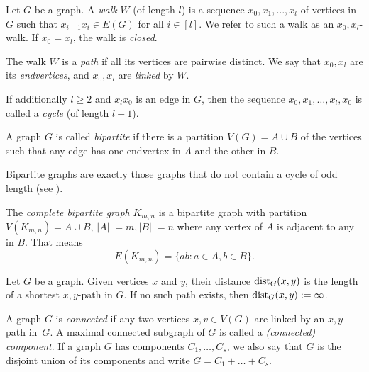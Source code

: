 \begin{definition}
    Let $G$ be a graph.
    A \textit{walk} $W$ (of length $l$) is a sequence $x_0, x_1, \dots, x_l$ of vertices in $G$ such that $x_{i - 1} x_i \in E(G)$ for all $i \in [l]$.
    We refer to such a walk as an $x_0,x_l$-walk.
    If $x_0 = x_l$, the walk is \textit{closed}.

    The walk $W$ is a \textit{path} if all its vertices are pairwise distinct. We say that $x_0, x_l$ are its \textit{endvertices}, and $x_0, x_l$ are \textit{linked} by $W$.
    
    If additionally $l \ge 2$ and $x_l x_0$ is an edge in $G$, then the sequence $x_0, x_1, \dots, x_l, x_0$ is called a \textit{cycle} (of length $l + 1$).
\end{definition}

\begin{definition}
    A graph $G$ is called \textit{bipartite} if there is a partition $V(G) = A \cup B$ of the vertices such that any edge has one endvertex in $A$ and the other in $B$.
\end{definition}

Bipartite graphs are exactly those graphs that do not contain a cycle of odd length (see \cite[Theorem I.4]{bollobas}).

\begin{example}
    The \textit{complete bipartite graph} $K_{m,n}$ is a bipartite graph with partition $V(K_{m, n}) = A \cup B$, $|A|\;=m, |B|\;=n$ where any vertex of $A$ is adjacent to any in $B$.
    That means
    \begin{equation*}
        E(K_{m,n}) = \{ ab : a \in A, b \in B \}.
    \end{equation*}
\end{example}

\begin{definition}
    Let $G$ be a graph. Given vertices $x$ and $y$, their distance $\operatorname{dist}_G (x, y)$ is the length of a shortest $x,y$-path in $G$.
    If no such path exists, then $\operatorname{dist}_G (x, y) := \infty$.

    A graph $G$ is \textit{connected} if any two vertices $x, v \in V(G)$ are linked by an $x,y$-path \mbox{in $G$}.
    A maximal connected subgraph of $G$ is called a \textit{(connected) component}. 
    If a graph $G$ has components $C_1, \dots, C_s$, we also say that $G$ is the disjoint union of its components and write $G = C_1 + \dots + C_s$.
\end{definition}

